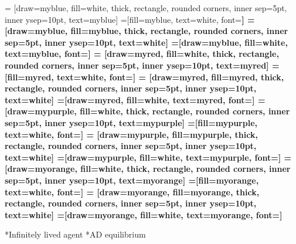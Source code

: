 \documentclass[10pt,a4paper]{article}
\makeatletter
\renewcommand{\section}{\@startsection{section}{1}{0mm}{1ex}{.2ex}{\normalsize\bfseries}}
\renewcommand{\subsection}{\@startsection{subsection}{1}{0mm}{.2ex}{.2ex}{\small\bfseries}}
\makeatother
\begin{document}

\scriptsize
\begin{multicols*}{3}

 = [draw=myblue, fill=white, thick, rectangle, rounded corners, inner sep=5pt, inner ysep=10pt, text=myblue]
 =[fill=myblue, text=white, font=\bfseries]
 = [draw=myblue, fill=myblue, thick, rectangle, rounded corners, inner sep=5pt, inner ysep=10pt, text=white]
 =[draw=myblue, fill=white, text=myblue, font=\bfseries]
 = [draw=myred, fill=white, thick, rectangle, rounded corners, inner sep=5pt, inner ysep=10pt, text=myred]
 =[fill=myred, text=white, font=\bfseries]
 = [draw=myred, fill=myred, thick, rectangle, rounded corners, inner sep=5pt, inner ysep=10pt, text=white]
 =[draw=myred, fill=white, text=myred, font=\bfseries]
 = [draw=mypurple, fill=white, thick, rectangle, rounded corners, inner sep=5pt, inner ysep=10pt, text=mypurple]
 =[fill=mypurple, text=white, font=\bfseries]
 = [draw=mypurple, fill=mypurple, thick, rectangle, rounded corners, inner sep=5pt, inner ysep=10pt, text=white]
 =[draw=mypurple, fill=white, text=mypurple, font=\bfseries]
 = [draw=myorange, fill=white, thick, rectangle, rounded corners, inner sep=5pt, inner ysep=10pt, text=myorange]
 =[fill=myorange, text=white, font=\bfseries]
 = [draw=myorange, fill=myorange, thick, rectangle, rounded corners, inner sep=5pt, inner ysep=10pt, text=white]
 =[draw=myorange, fill=white, text=myorange, font=\bfseries]

\section*{Infinitely lived agent}
\subsection*{AD equilibrium}
\vspace{2pt}
\end{multicols*}
\end{document}
